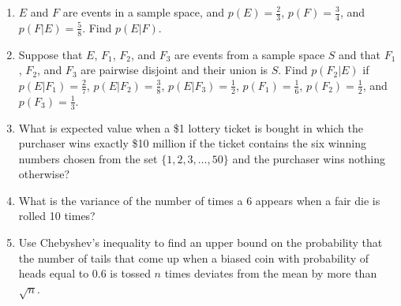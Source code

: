 \documentclass[11pt]{article}
\begin{document}
\begin{enumerate}
    \item $E$ and $F$ are events in a sample space, and $p(E) = \frac{2}{3}$, $p(F) = \frac{3}{4}$, and $p(F|E) = \frac{5}{8}$. Find $p(E|F)$.
    \item Suppose that $E$, $F_1$, $F_2$, and $F_3$ are events from a sample space $S$ and that $F_1$, $F_2$, and $F_3$ are pairwise disjoint and their union is $S$. Find $p(F_2|E)$ if $p(E|F_1) = \frac{2}{7}$, $p(E|F_2) = \frac{3}{8}$, $p(E|F_3) = \frac{1}{2}$, $p(F_1) = \frac{1}{6}$, $p(F_2) = \frac{1}{2}$, and $p(F_3) = \frac{1}{3}$.
    \item What is expected value when a \$1 lottery ticket is bought in which the purchaser wins exactly \$10 million if the ticket contains the six winning numbers chosen from the set $\{1, 2, 3, \ldots, 50\}$ and the purchaser wins nothing otherwise?
    \item What is the variance of the number of times a 6 appears when a fair die is rolled 10 times?
    \item Use Chebyshev's inequality to find an upper bound on the probability that the number of tails that come up when a biased coin with probability of heads equal to 0.6 is tossed $n$ times deviates from the mean by more than $\sqrt{n}$.
\end{enumerate}
\end{document}

